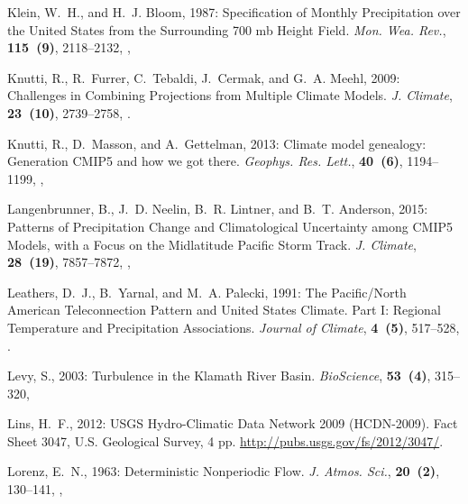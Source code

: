\documentclass[final, double]{ua-thesis}
\begin{document}
\begin{thebibliography}{}
Klein, W.~H., and H.~J. Bloom, 1987: Specification of {Monthly} {Precipitation}
  over the {United} {States} from the {Surrounding} 700 mb {Height} {Field}.
  \textit{Mon. Wea. Rev.}, \textbf{115~(9)}, 2118--2132,
  ,

Knutti, R., R.~Furrer, C.~Tebaldi, J.~Cermak, and G.~A. Meehl, 2009: Challenges
  in {Combining} {Projections} from {Multiple} {Climate} {Models}. \textit{J.
  Climate}, \textbf{23~(10)}, 2739--2758, .

Knutti, R., D.~Masson, and A.~Gettelman, 2013: Climate model genealogy:
  {Generation} {CMIP}5 and how we got there. \textit{Geophys. Res. Lett.},
  \textbf{40~(6)}, 1194--1199, ,

Langenbrunner, B., J.~D. Neelin, B.~R. Lintner, and B.~T. Anderson, 2015:
  Patterns of {Precipitation} {Change} and {Climatological} {Uncertainty} among
  {CMIP}5 {Models}, with a {Focus} on the {Midlatitude} {Pacific} {Storm}
  {Track}. \textit{J. Climate}, \textbf{28~(19)}, 7857--7872,
  ,

Leathers, D.~J., B.~Yarnal, and M.~A. Palecki, 1991: The {Pacific}/{North}
  {American} {Teleconnection} {Pattern} and {United} {States} {Climate}. {Part}
  {I}: {Regional} {Temperature} and {Precipitation} {Associations}.
  \textit{Journal of Climate}, \textbf{4~(5)}, 517--528,
  .

Levy, S., 2003: Turbulence in the {Klamath} {River} {Basin}.
  \textit{BioScience}, \textbf{53~(4)}, 315--320,

Lins, H.~F., 2012: {USGS} {Hydro}-{Climatic} {Data} {Network} 2009
  ({HCDN}-2009). Fact {Sheet} 3047, U.S. Geological Survey, 4 pp.
  \urlprefix\url{http://pubs.usgs.gov/fs/2012/3047/}.

Lorenz, E.~N., 1963: Deterministic {Nonperiodic} {Flow}. \textit{J. Atmos.
  Sci.}, \textbf{20~(2)}, 130--141,
  ,


\end{thebibliography}
\end{document}
